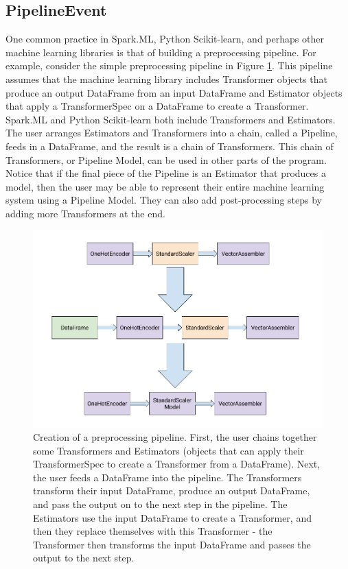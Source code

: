 \subsection{PipelineEvent}
One common practice in Spark.ML, Python Scikit-learn, and perhaps other machine learning
libraries is that of building a preprocessing pipeline. For example, consider the simple
preprocessing pipeline in Figure \ref{fig:preprocessing_pipeline}. This pipeline assumes
that the machine learning library includes Transformer objects that produce an output DataFrame
from an input DataFrame and Estimator objects that apply a TransformerSpec on a DataFrame to create
a Transformer. Spark.ML and Python Scikit-learn both include Transformers and Estimators. The user
arranges Estimators and Transformers into a chain, called a Pipeline, feeds in a DataFrame, and the result is a chain
of Transformers. This chain of Transformers, or Pipeline Model, can be used in other parts of the 
program. Notice that if the final piece of the Pipeline is an Estimator that produces a model, then
the user may be able to represent their entire machine learning system using a Pipeline Model. They can also
add post-processing steps by adding more Transformers at the end.

\begin{figure}
  \centering
  \includegraphics[height=3.0in]{preprocessing_pipeline}
  \caption{
    Creation of a preprocessing pipeline. First, the user chains together some
    Transformers and Estimators (objects that can apply their TransformerSpec to
    create a Transformer from a DataFrame). Next, the user feeds a DataFrame into the pipeline. The
    Transformers transform their input DataFrame, produce an output DataFrame, and
    pass the output on to the next step in the pipeline. The Estimators use the input DataFrame
    to create a Transformer, and then they replace themselves with this Transformer - the
    Transformer then transforms the input DataFrame and passes the output to the next step.
  }
  \label{fig:preprocessing_pipeline}
\end{figure}

